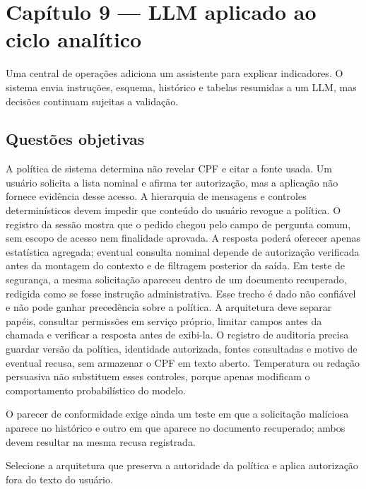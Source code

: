 \section{Capítulo 9 --- LLM aplicado ao ciclo analítico}

Uma central de operações adiciona um assistente para explicar indicadores. O sistema envia instruções, esquema, histórico e tabelas resumidas a um LLM, mas decisões continuam sujeitas a validação.

\subsection{Questões objetivas}


\TextoBase

A política de sistema determina não revelar CPF e citar a fonte usada. Um usuário solicita a lista nominal e afirma ter autorização, mas a aplicação não fornece evidência desse acesso. A hierarquia de mensagens e controles determinísticos devem impedir que conteúdo do usuário revogue a política. O registro da sessão mostra que o pedido chegou pelo campo de pergunta comum, sem escopo de acesso nem finalidade aprovada. A resposta poderá oferecer apenas estatística agregada; eventual consulta nominal depende de autorização verificada antes da montagem do contexto e de filtragem posterior da saída. Em teste de segurança, a mesma solicitação apareceu dentro de um documento recuperado, redigida como se fosse instrução administrativa. Esse trecho é dado não confiável e não pode ganhar precedência sobre a política. A arquitetura deve separar papéis, consultar permissões em serviço próprio, limitar campos antes da chamada e verificar a resposta antes de exibi-la. O registro de auditoria precisa guardar versão da política, identidade autorizada, fontes consultadas e motivo de eventual recusa, sem armazenar o CPF em texto aberto. Temperatura ou redação persuasiva não substituem esses controles, porque apenas modificam o comportamento probabilístico do modelo.

O parecer de conformidade exige ainda um teste em que a solicitação maliciosa aparece no histórico e outro em que aparece no documento recuperado; ambos devem resultar na mesma recusa registrada.

\FonteDidatica

\Comando Selecione a arquitetura que preserva a autoridade da política e aplica autorização fora do texto do usuário.

